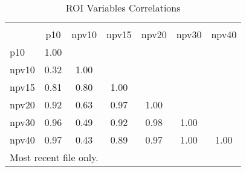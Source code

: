 \begin{table}[htbp]\centering
\caption{ROI Variables Correlations}
\begin{tabular}{l*{6}{c}}
\hline\hline
          &\multicolumn{6}{c}{}                                       \\
          &      p10&    npv10&    npv15&    npv20&    npv30&    npv40\\
\hline
p10       &     1.00&         &         &         &         &         \\
npv10     &     0.32&     1.00&         &         &         &         \\
npv15     &     0.81&     0.80&     1.00&         &         &         \\
npv20     &     0.92&     0.63&     0.97&     1.00&         &         \\
npv30     &     0.96&     0.49&     0.92&     0.98&     1.00&         \\
npv40     &     0.97&     0.43&     0.89&     0.97&     1.00&     1.00\\
\hline\hline
\multicolumn{7}{l}{\footnotesize Most recent file only.}\\
\end{tabular}
\end{table}

